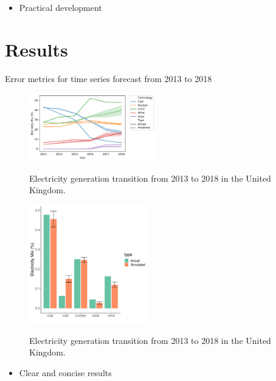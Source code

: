 \documentclass[final,3p,times,twocolumn,numbers]{elsarticle}
\begin{document}
\begin{itemize}
	\item Practical development
\end{itemize}

\section{Results}
\label{sec:results}

\begin{table}[htb]
    \centering
{}
    \caption{Error metrics for time series forecast from 2013 to 2018}\label{table:metrics}
\end{table}


\begin{figure}
\centering
\includegraphics[width=0.49\textwidth]{figures/results/throughout_years.pdf}
\label{uk_historical_mix}
\caption{Electricity generation transition from 2013 to 2018 in the United Kingdom.}
\end{figure}


\begin{figure}
\centering
\includegraphics[width=0.46\textwidth]{figures/results/best_run.pdf}
\label{uk_historical_mix}
\caption{Electricity generation transition from 2013 to 2018 in the United Kingdom.}
\end{figure}

\begin{itemize}
	\item Clear and concise results
\end{itemize}
\end{document}
